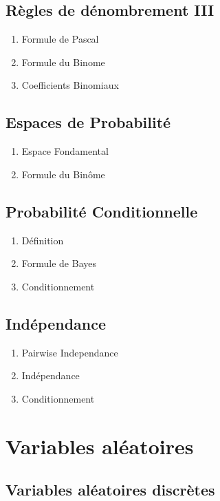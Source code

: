 \documentclass{article}
\begin{document}
\subsection{Règles de dénombrement III}

\begin{enumerate}
    \item Formule de Pascal
    \item Formule du Binome
    \item Coefficients Binomiaux
\end{enumerate}

\subsection{Espaces de Probabilité}

\begin{enumerate}
    \item Espace Fondamental
    \item Formule du Binôme
\end{enumerate}

\subsection{Probabilité Conditionnelle}

\begin{enumerate}
    \item Définition
    \item Formule de Bayes
    \item Conditionnement
\end{enumerate}

\subsection{Indépendance}

\begin{enumerate}
    \item Pairwise Independance
    \item Indépendance
    \item Conditionnement
\end{enumerate}

\section{Variables aléatoires}

\subsection{Variables aléatoires discrètes}
\end{document}
